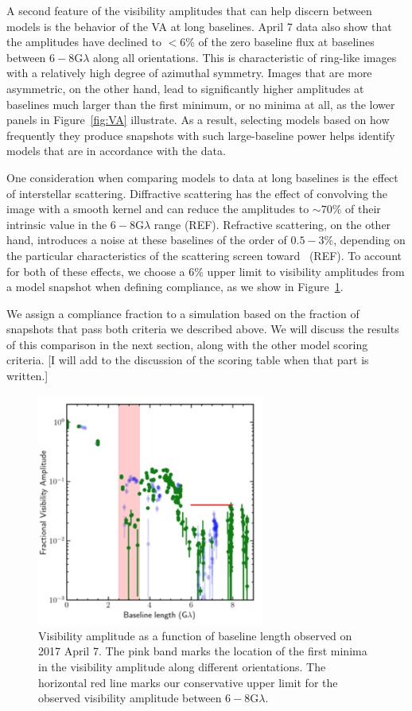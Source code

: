 A second feature of the visibility amplitudes that can help discern
between models is the behavior of the VA at long baselines. April 7
data also show that the amplitudes have declined to $<6\%$ of the zero
baseline flux at baselines between $6-8$\;G$\lambda$ along all
orientations. This is characteristic of ring-like images with a
relatively high degree of azimuthal symmetry. Images that are more
asymmetric, on the other hand, lead to significantly higher amplitudes
at baselines much larger than the first minimum, or no minima at all,
as the lower panels in Figure~\ref{fig:VA} illustrate. As a result,
selecting models based on how frequently they produce snapshots with
such large-baseline power helps identify models that are in accordance
with the data.

One consideration when comparing models to data at long baselines
is the effect of interstellar scattering. Diffractive scattering has
the effect of convolving the image with a smooth kernel and can
reduce the amplitudes to $\sim 70\%$ of their intrinsic value in the
$6-8$\;G$\lambda$ range (REF).  Refractive scattering, on the other
hand, introduces a noise at these baselines of the order of $0.5-3\%$,
depending on the particular characteristics of the scattering screen
toward \sgra\ (REF). To account for both of these effects, we choose a
$6\%$ upper limit to visibility amplitudes from a model snapshot
when defining compliance, as we show in Figure~\ref{fig:data_comp}.

We assign a compliance fraction to a simulation based on the fraction
of snapshots that pass both criteria we described above. We will
discuss the results of this comparison in the next section, along with
the other model scoring criteria. [I will add to the discussion of the
scoring table when that part is written.]

\begin{figure}
 \centerline{
    \includegraphics[width=7.5cm] {data_3599}}
\caption{\footnotesize Visibility amplitude as a function of baseline length observed on 2017 April 7. The pink band marks the location of the first minima in the visibility amplitude along different orientations. The horizontal red line marks our conservative upper limit for the observed visibility amplitude between $6-8$G$\lambda$.}
\label{fig:data_comp}
\end{figure}

